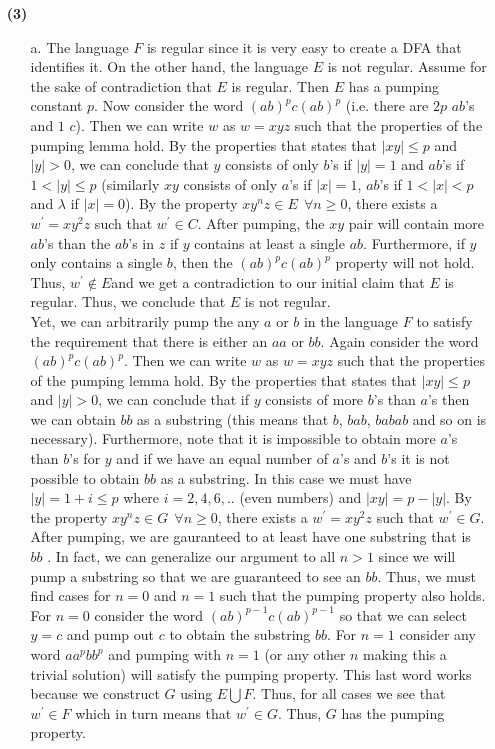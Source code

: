 \documentclass [10pt]{article}
\begin{document}
\begin{enumerate}
	\item[\textbf{(3)}]
	\begin{enumerate}
		\item[a.]The language $F$ is regular since it is very easy to create a DFA that identifies it. On the other hand, the language $E$ is not regular. Assume for the sake of contradiction that $E$ is regular. Then $E$ has a pumping constant $p$. Now consider the word $(ab)^{p}c(ab)^{p}$ (i.e. there are $2p$ $ab$'s and $1$ $c$). Then we can write $w$ as $w = xyz$ such that the properties of the pumping lemma hold. By the properties that states that $\left|xy\right| \le p$ and $\left|y\right| > 0$, we can conclude that $y$ consists of only $b$'s if $\left|y\right|=1$ and $ab$'s if $1 < \left|y\right|\le p$ (similarly $xy$ consists of only $a$'s if $\left|x\right|=1$, $ab$'s if $1 < \left|x\right| < p$ and $\lambda$ if $\left|x\right|=0$). By the property $xy^{n}z \in E\:\:\forall n \ge 0$, there exists a $w^{\prime} = xy^{2}z$ such that $w^{\prime} \in C$. After pumping, the $xy$ pair will contain more $ab$'s than the $ab$'s in $z$ if $y$ contains at least a single $ab$. Furthermore, if $y$ only contains a single $b$, then the $(ab)^{p}c(ab)^{p}$ property will not hold. Thus, $w^{\prime} \notin E$and we get a contradiction to our initial claim that $E$ is regular. Thus, we conclude that $E$ is not regular.\\
		Yet, we can arbitrarily pump the any $a$ or $b$ in the language $F$ to satisfy the requirement that there is either an $aa$ or $bb$. Again consider the word $(ab)^{p}c(ab)^{p}$. Then we can write $w$ as $w = xyz$ such that the properties of the pumping lemma hold. By the properties that states that $\left|xy\right| \le p$ and $\left|y\right| > 0$, we can conclude that if $y$ consists of more $b$'s than $a$'s then we can obtain $bb$ as a substring (this means that $b$, $bab$, $babab$ and so on is necessary). Furthermore, note that it is impossible to obtain more $a$'s than $b$'s for $y$ and if we have an equal number of $a$'s and $b$'s it is not possible to obtain $bb$ as a substring. In this case we must have $\left|y\right| = 1 + i \le p$ where $i = 2,4,6,..$ (even numbers) and $\left|xy\right| = p - \left|y\right|$. By the property $xy^{n}z \in G\:\:\forall n \ge 0$, there exists a $w^{\prime} = xy^{2}z$ such that $w^{\prime} \in G$. After pumping, we are gauranteed to at least have one substring that is $bb$ . In fact, we can generalize our argument to all $n>1$ since we will pump a substring so that we are guaranteed to see an $bb$. Thus, we must find cases for $n=0$ and $n=1$ such that the pumping property also holds. For $n=0$ consider the word $(ab)^{p-1}c(ab)^{p-1}$ so that we can select $y=c$ and pump out $c$ to obtain the substring $bb$. For $n=1$ consider any word $aa^{p}bb^{p}$ and pumping with $n=1$ (or any other $n$ making this a trivial solution) will satisfy the pumping property. This last word works because we construct $G$ using $E\bigcup F$. Thus, for all cases we see that $w^{\prime} \in F$ which in turn means that $w^{\prime} \in G$. Thus, $G$ has the pumping property.

\end{enumerate}
\end{enumerate}
\end{document}

